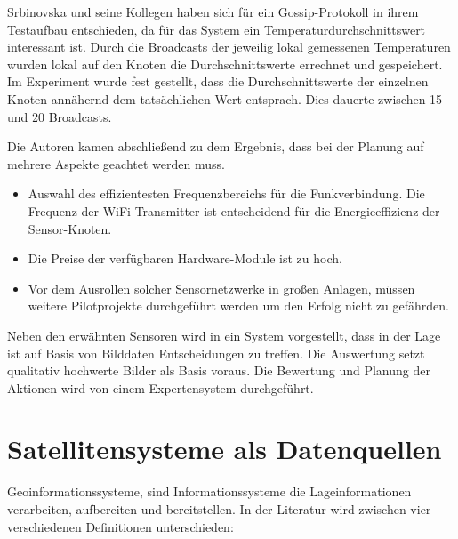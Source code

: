 Srbinovska und seine Kollegen haben sich für ein Gossip-Protokoll in ihrem Testaufbau entschieden, da für das System ein Temperaturdurchschnittswert interessant ist. Durch die Broadcasts der jeweilig lokal gemessenen Temperaturen wurden lokal auf den Knoten die Durchschnittswerte errechnet und gespeichert. Im Experiment wurde fest gestellt, dass die Durchschnittswerte der einzelnen Knoten annähernd dem tatsächlichen Wert entsprach. Dies dauerte zwischen 15 und 20 Broadcasts.\cite{jour:Srbinovska2014}

Die Autoren kamen abschließend zu dem Ergebnis, dass bei der Planung auf mehrere Aspekte geachtet werden muss.\cite{jour:Srbinovska2014}
\begin{itemize}
	\item Auswahl des effizientesten Frequenzbereichs für die Funkverbindung. Die Frequenz der WiFi-Transmitter ist entscheidend für die Energieeffizienz der Sensor-Knoten.
	\item Die Preise der verfügbaren Hardware-Module ist zu hoch.
	\item Vor dem Ausrollen solcher Sensornetzwerke in großen Anlagen, müssen weitere Pilotprojekte durchgeführt werden um den Erfolg nicht zu gefährden.
\end{itemize}

Neben den erwähnten Sensoren wird in \cite{jour:Romeo2013} ein System vorgestellt, dass in der Lage ist auf Basis von Bilddaten Entscheidungen zu treffen. Die Auswertung setzt qualitativ hochwerte Bilder als Basis voraus. Die Bewertung und Planung der Aktionen wird von einem Expertensystem durchgeführt.

\section{Satellitensysteme als Datenquellen}

Geoinformationssysteme, sind Informationssysteme die Lageinformationen verarbeiten, aufbereiten und bereitstellen. In der Literatur wird zwischen vier verschiedenen Definitionen unterschieden:\cite{book:Carosio2006}

